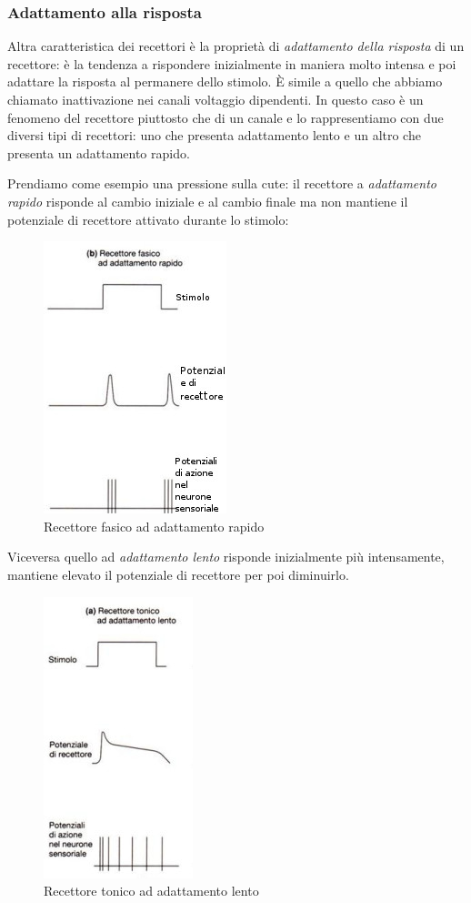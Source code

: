 \documentclass[a4paper,12pt]{article}
\begin{document}
\subsubsection{Adattamento alla risposta}
Altra caratteristica dei recettori è la proprietà di \emph{adattamento della risposta} di un recettore: è la tendenza a rispondere inizialmente in maniera molto intensa e poi adattare la risposta al permanere dello stimolo. È simile a quello che abbiamo chiamato inattivazione nei canali voltaggio dipendenti. In questo caso è un fenomeno del recettore piuttosto che di un canale e lo rappresentiamo con due diversi tipi di recettori: uno che presenta adattamento lento e un altro che presenta un adattamento rapido.

Prendiamo come esempio una pressione sulla cute: il recettore a \emph{adattamento rapido} risponde al cambio iniziale e al cambio finale ma non mantiene il potenziale di recettore attivato durante lo stimolo:


\begin{figure}[H]
\centering
\includegraphics[scale=0.6]{immagine/rapido.jpg}
\caption{Recettore fasico ad adattamento rapido}
\end{figure}


Viceversa quello ad \emph{adattamento lento} risponde inizialmente più intensamente, mantiene elevato il potenziale di recettore per poi diminuirlo. 


\begin{figure}[H]
\centering
\includegraphics[scale=0.6]{immagine/lento.jpg}
\caption{Recettore tonico ad adattamento lento}
\end{figure}
\end{document}

